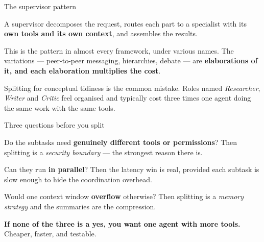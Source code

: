 \documentclass[aspectratio=169,11pt,t]{beamer}
\begin{document}
\begin{frame}[shrink=25]{The supervisor pattern}
{\fontsize{9.4}{12.6}\selectfont\color{fg2}A supervisor decomposes the request, routes each part to a specialist with its \textbf{own tools and its own context}, and assembles the results.\par}\vskip 4pt
{\fontsize{9.4}{12.6}\selectfont\color{fg2}This is the pattern in almost every framework, under various names. The variations --- peer-to-peer messaging, hierarchies, debate --- are \textbf{elaborations of it, and each elaboration multiplies the cost}.\par}\vskip 4pt
\begin{iband}[signal]
Splitting for conceptual tidiness is the common mistake. Roles named \textit{Researcher}, \textit{Writer} and \textit{Critic} feel organised and typically cost three times one agent doing the same work with the same tools.
\end{iband}
\end{frame}

\begin{frame}[shrink=25]{Three questions before you split}
\begin{isteps}
\item Do the subtasks need \textbf{genuinely different tools or permissions}? Then splitting is a \textit{security boundary} --- the strongest reason there is.
\item Can they run \textbf{in parallel}? Then the latency win is real, provided each subtask is slow enough to hide the coordination overhead.
\item Would one context window \textbf{overflow} otherwise? Then splitting is a \textit{memory strategy} and the summaries are the compression.
\end{isteps}
\begin{iband}[signal]
\textbf{If none of the three is a yes, you want one agent with more tools.} Cheaper, faster, and testable.
\end{iband}
\end{frame}
\end{document}
